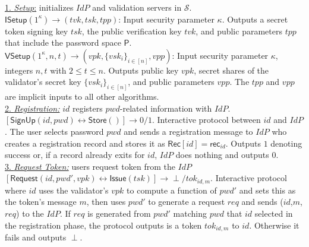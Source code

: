\documentclass[conference]{IEEEtran}
\newcommand{\secparameter}{\kappa}
\newcommand{\pwd}{pwd}
\newcommand{\uid}{id}
\newcommand{\sP}{\mathsf{P}}
\newcommand{\tvk}{tvk}
\newcommand{\tsk}{tsk}
\newcommand{\tpp}{tpp}
\newcommand{\vpk}{vpk}
\newcommand{\vsk}{vsk}
\newcommand{\vpp}{vpp}
\begin{document}
\noindent \underline{1. {\em Setup}:} initializes $IdP$ and validation servers in $\mathcal{S}$.\\
$\mathsf{ISetup}({1^{\secparameter}}) \rightarrow (\tvk,\tsk,\tpp)$: Input security parameter $\secparameter$. Outputs a secret token signing key $\tsk$, the public verification key $\tvk$, and public parameters $\tpp$ that include the password space $\sP$.\\
$\mathsf{VSetup}(1^{\secparameter}, n, t) \rightarrow (\vpk,\{\vsk_{i}\}_{i \in [n]}, \vpp)$: Input security parameter $\secparameter$, integers $n,t$ with $2 \leq t \leq n$. Outputs public key $\vpk$, secret shares of the validator's secret key $\{\vsk_{i}\}_{i \in [n]}$, and public parameters $\vpp$. The $\tpp$ and $\vpp$ are implicit inputs to all other algorithms.\\ %
    \vspace{0.5mm}
    \noindent
\underline{2. {\em Registration:}} $\uid$ registers $pwd$-related information with $IdP$.\\
$[\mathsf{SignUp}(\uid,\pwd) \longleftrightarrow \mathsf{Store}()] \rightarrow 0/1$. Interactive protocol between $\uid$ and $IdP$. The user selects password $\pwd$ and sends a registration message to $IdP$ who creates a registration record and stores it as $\mathsf{Rec}[\uid] = \mathsf{rec}_{\uid}$. Outputs $1$ denoting success or, if a record already exits for $\uid$, $IdP$ does nothing and outputs $0$.\\
     \vspace{0.5mm}
    \noindent
\underline{3. {\em Request Token:}} users request token from the $IdP$ %
$[\mathsf{Request}(\uid, \pwd', \vpk) \longleftrightarrow \mathsf{Issue}(\tsk)] \rightarrow \perp/tok_{\uid,m}$. Interactive protocol where $\uid$ uses the validator's $\vpk$ %
to compute a function of $\pwd'$ and sets this as the token's message $m$, then uses $\pwd'$ to generate a request $req$ and sends ($\uid$,$m$, $req$) to the $IdP$. If $req$ is generated from $pwd'$ matching $pwd$ that $\uid$ selected in the registration phase, the protocol outputs is a token $tok_{\uid,m}$ to $\uid$. Otherwise it fails and outputs $\perp$.\\
\end{document}
